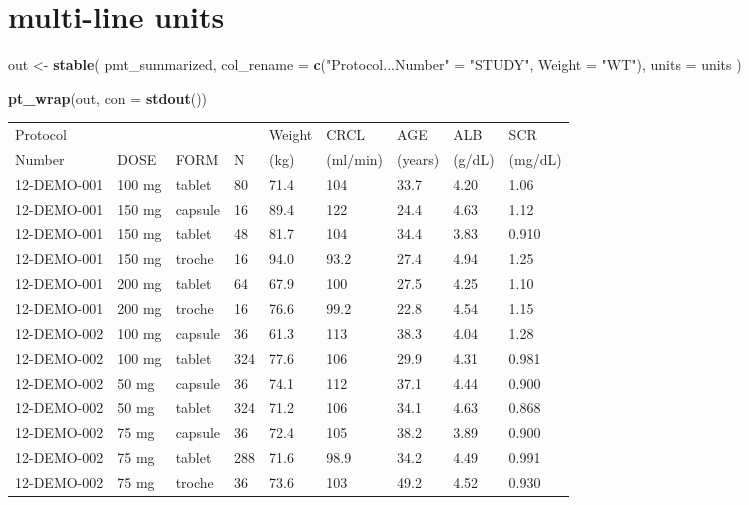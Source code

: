\documentclass[
]{article}
\newenvironment{Shaded}{\begin{snugshade}}{\end{snugshade}}
\newcommand{\DataTypeTok}[1]{\textcolor[rgb]{0.13,0.29,0.53}{#1}}
\newcommand{\KeywordTok}[1]{\textcolor[rgb]{0.13,0.29,0.53}{\textbf{#1}}}
\newcommand{\NormalTok}[1]{#1}
\newcommand{\StringTok}[1]{\textcolor[rgb]{0.31,0.60,0.02}{#1}}
\begin{document}
\clearpage

\hypertarget{multi-line-units}{%
\section{multi-line units}\label{multi-line-units}}

\begin{Shaded}
\begin{Highlighting}[]
\NormalTok{out <-}\StringTok{ }\KeywordTok{stable}\NormalTok{(}
\NormalTok{  pmt_summarized, }
  \DataTypeTok{col_rename =} \KeywordTok{c}\NormalTok{(}\StringTok{"Protocol...Number"}\NormalTok{ =}\StringTok{ "STUDY"}\NormalTok{, }\DataTypeTok{Weight =} \StringTok{"WT"}\NormalTok{), }
  \DataTypeTok{units =}\NormalTok{ units}
\NormalTok{)}

\KeywordTok{pt_wrap}\NormalTok{(out, }\DataTypeTok{con =} \KeywordTok{stdout}\NormalTok{()) }
\end{Highlighting}
\end{Shaded}

\begin{table}[h]
\centering
{\def\arraystretch{1.4}\tabcolsep=5pt
\begin{threeparttable}
\begin{tabular}[h]{lllllllll}
\hline
Protocol &  &  &  & Weight & CRCL & AGE & ALB & SCR \\ [-0.56em]
Number & DOSE & FORM & N & (kg) & (ml/min) & (years) & (g/dL) & (mg/dL) \\
\hline
12-DEMO-001 & 100 mg & tablet & 80 & 71.4 & 104 & 33.7 & 4.20 & 1.06 \\
12-DEMO-001 & 150 mg & capsule & 16 & 89.4 & 122 & 24.4 & 4.63 & 1.12 \\
12-DEMO-001 & 150 mg & tablet & 48 & 81.7 & 104 & 34.4 & 3.83 & 0.910 \\
12-DEMO-001 & 150 mg & troche & 16 & 94.0 & 93.2 & 27.4 & 4.94 & 1.25 \\
12-DEMO-001 & 200 mg & tablet & 64 & 67.9 & 100 & 27.5 & 4.25 & 1.10 \\
12-DEMO-001 & 200 mg & troche & 16 & 76.6 & 99.2 & 22.8 & 4.54 & 1.15 \\
12-DEMO-002 & 100 mg & capsule & 36 & 61.3 & 113 & 38.3 & 4.04 & 1.28 \\
12-DEMO-002 & 100 mg & tablet & 324 & 77.6 & 106 & 29.9 & 4.31 & 0.981 \\
12-DEMO-002 & 50 mg & capsule & 36 & 74.1 & 112 & 37.1 & 4.44 & 0.900 \\
12-DEMO-002 & 50 mg & tablet & 324 & 71.2 & 106 & 34.1 & 4.63 & 0.868 \\
12-DEMO-002 & 75 mg & capsule & 36 & 72.4 & 105 & 38.2 & 3.89 & 0.900 \\
12-DEMO-002 & 75 mg & tablet & 288 & 71.6 & 98.9 & 34.2 & 4.49 & 0.991 \\
12-DEMO-002 & 75 mg & troche & 36 & 73.6 & 103 & 49.2 & 4.52 & 0.930 \\
\hline
\end{tabular}
\end{threeparttable}
}
\end{table}
\end{document}
